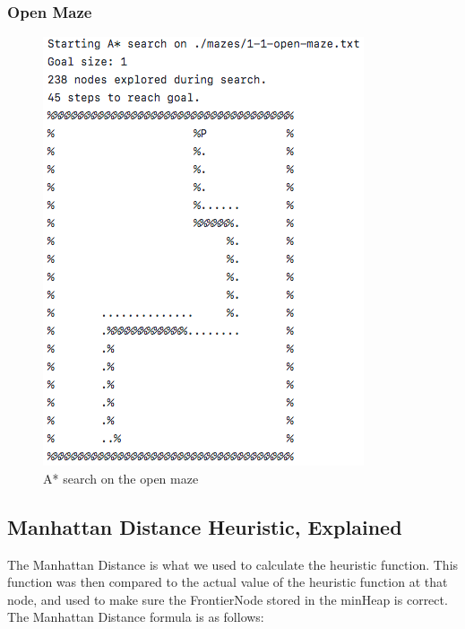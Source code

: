 \documentclass[titlepage]{article}
\begin{document}
\subsubsection{Open Maze}
\begin{figure}[h!]
\includegraphics[width=\linewidth]{astaropen.png}
\caption{A* search on the open maze}
\label{fig:ASTARopen}
\end{figure}

\newpage

\subsection{Manhattan Distance Heuristic, Explained}
The Manhattan Distance is what we used to calculate the heuristic function. This function was then compared to the actual value of the heuristic function at that node, and used to make sure the FrontierNode stored in the minHeap is correct. The Manhattan Distance formula is as follows:
\end{document}

